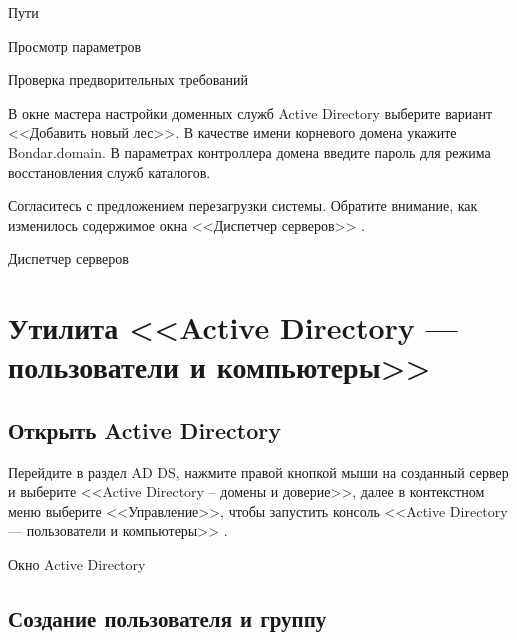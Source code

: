 \begin{image}
	\caption{Пути}
	\label{fig:srule:paths}
\end{image}

\begin{image}
	\caption{Просмотр параметров}
	\label{fig:srule:view}
\end{image}

\begin{image}
	\caption{Проверка предворительных требований}
	\label{fig:srule:check}
\end{image}

В окне мастера настройки доменных служб Active Directory
выберите вариант <<Добавить новый лес>>.
В качестве имени корневого домена укажите Bondar.domain.
В параметрах контроллера домена введите пароль
для режима восстановления служб каталогов.

Согласитесь с предложением перезагрузки системы.
Обратите внимание,
как изменилось содержимое окна <<Диспетчер серверов>>
.

\begin{image}
	\caption{Диспетчер серверов}
	\label{fig:diff:server:dispetcher}
\end{image}

\section{Утилита <<Active Directory --- пользователи и компьютеры>>}

\subsection{Открыть Active Directory}

Перейдите в раздел AD DS,
нажмите правой кнопкой мыши на созданный сервер
и выберите <<Active Directory -- домены и доверие>>,
далее в контекстном меню выберите <<Управление>>,
чтобы запустить консоль <<Active Directory --- пользователи и компьютеры>>
.

\begin{image}
	\caption{Окно Active Directory}
	\label{fig:activedir}
\end{image}

\subsection{Создание пользователя и группу}

